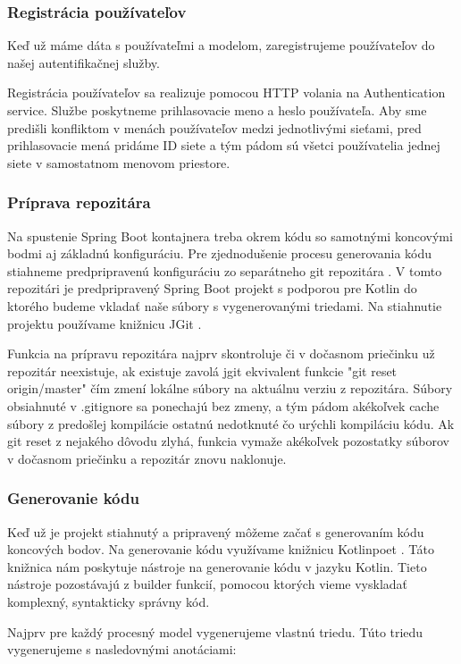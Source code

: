\subsubsection{Registrácia používateľov}
Keď už máme dáta s používateľmi a modelom, zaregistrujeme používateľov do našej autentifikačnej služby.

Registrácia používateľov sa realizuje pomocou HTTP volania na Authentication service. Službe poskytneme prihlasovacie meno a heslo používateľa. Aby sme predišli konfliktom v menách používateľov medzi jednotlivými sieťami, pred prihlasovacie mená pridáme ID siete a tým pádom sú všetci používatelia jednej siete v samostatnom menovom priestore.

\subsubsection{Príprava repozitára}
Na spustenie Spring Boot kontajnera treba okrem kódu so samotnými koncovými bodmi aj základnú konfiguráciu. Pre zjednodušenie procesu generovania kódu stiahneme predpripravenú konfiguráciu zo separátneho git repozitára \cite{dp_relay}. V tomto repozitári je predpripravený Spring Boot projekt s podporou pre Kotlin do ktorého budeme vkladať naše súbory s vygenerovanými triedami. Na stiahnutie projektu používame knižnicu JGit \cite{jgit}.

Funkcia na prípravu repozitára najprv skontroluje či v dočasnom priečinku už repozitár neexistuje, ak existuje zavolá jgit ekvivalent funkcie "git reset origin/master" čím zmení lokálne súbory na aktuálnu verziu z repozitára. Súbory obsiahnuté v .gitignore sa ponechajú bez zmeny, a tým pádom akékoľvek cache súbory z predošlej kompilácie ostatnú nedotknuté čo urýchli kompiláciu kódu. Ak git reset z nejakého dôvodu zlyhá, funkcia vymaže akékoľvek pozostatky súborov v dočasnom priečinku a repozitár znovu naklonuje.

\subsubsection{Generovanie kódu}
Keď už je projekt stiahnutý a pripravený môžeme začať s generovaním kódu koncových bodov. Na generovanie kódu  využívame knižnicu Kotlinpoet \cite{kotlinpoet}. Táto knižnica nám poskytuje nástroje na generovanie kódu v jazyku Kotlin. Tieto nástroje pozostávajú z builder funkcií, pomocou ktorých vieme vyskladať komplexný, syntakticky správny kód.

Najprv pre každý procesný model vygenerujeme vlastnú triedu. Túto triedu vygenerujeme s nasledovnými anotáciami:

